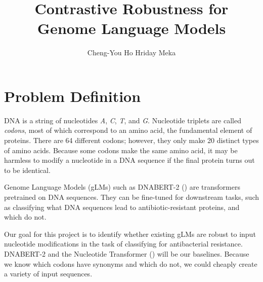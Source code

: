\documentclass{article}
\title{Contrastive Robustness for Genome Language Models}
\author{Cheng-You Ho \And Hriday Meka}
\newcommand{\todo}[1]{\textcolor{red}{[TODO: #1]}}
\begin{document}
\maketitle



\section{Problem Definition}
\label{sec:problem}

DNA is a string of nucleotides \textit{A}, \textit{C}, \textit{T}, and \textit{G}. Nucleotide triplets are called \textit{codons}, most of which correspond to an amino acid, the fundamental element of proteins. There are 64 different codons; however, they only make 20 distinct types of amino acids. Because some codons make the same amino acid, it may be harmless to modify a nucleotide in a DNA sequence if the final protein turns out to be identical.

Genome Language Models (gLMs) such as DNABERT-2 (\cite{zhou2024dnabert2}) are transformers pretrained on DNA sequences. They can be fine-tuned for downstream tasks, such as classifying what DNA sequences lead to antibiotic-resistant proteins, and which do not.

Our goal for this project is to identify whether existing gLMs are robust to input nucleotide modifications in the task of classifying for antibacterial resistance. DNABERT-2 and the Nucleotide Transformer (\cite{dalla2025nucleotide}) will be our baselines. Because we know which codons have synonyms and which do not, we could cheaply create a variety of input sequences.


\end{document}
